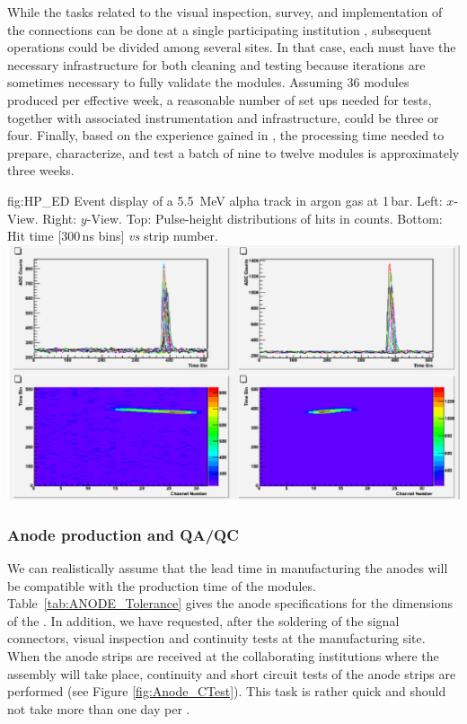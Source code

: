 While the tasks related to the  visual inspection, survey, and implementation of the  connections can be done at a single participating institution  
, subsequent operations could be divided among several sites. In that case, each 
must have the necessary infrastructure for 
both cleaning and testing because iterations are sometimes necessary to fully validate the 
 modules. Assuming \num{36}  modules produced per effective week, a reasonable number of set ups needed for   tests, together with associated instrumentation and infrastructure, could be three or four. Finally, based on the experience gained in  , the processing time needed to prepare, characterize, and test a batch of nine to twelve  modules is approximately three weeks.  
\begin{dunefigure}
{fig:HP_ED}
{Event display of a \SI{5.5}{MeV} alpha track in argon gas at \num{1}\,bar.  Left: $x$-View. Right: $y$-View. Top: Pulse-height distributions of hits in  counts. Bottom: Hit time [300\,ns bins] \textit{vs} strip number.}
\includegraphics[width=.8\textwidth]{graphics/HP_ED}
\end{dunefigure}
\subsubsection{Anode production and QA/QC}
\label{sec:dp-crp-ANODEprod}
We can realistically assume that the lead time in manufacturing the anodes will be compatible with the production time
of the  modules. Table~\ref{tab:ANODE_Tolerance} gives the anode specifications for the dimensions of the . In addition, we have requested, after the soldering of the signal connectors, visual inspection and continuity tests at the manufacturing site. When the anode strips are received at the collaborating institutions where the  assembly will take place, continuity and short circuit tests of the anode strips are performed (see Figure \ref{fig:Anode_CTest}). This task is rather quick and should not take more than one day per .  


